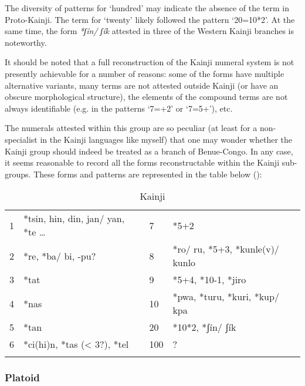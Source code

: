 The diversity of patterns for `hundred' may indicate the absence of the term in Proto-Kainji. The term for `twenty' likely followed the pattern ‘20=10*2’. At the same time, the form \textit{*ʃín/} \textit{ʃík} attested in three of the Western Kainji branches is noteworthy. 

It should be noted that a full reconstruction of the Kainji numeral system is not presently achievable for a number of reasons: some of the forms have multiple alternative variants, many terms are not attested outside Kainji (or have an obscure morphological structure), the elements of the compound terms are not always identifiable (e.g. in the patterns ‘7=+2’ or ‘7=5+’), etc.

The numerals attested within this group are so peculiar (at least for a non-specialist in the Kainji languages like myself) that one may wonder whether the Kainji group should indeed be treated as a branch of Benue-Congo. In any case, it seems reasonable to record all the forms reconstructable within the Kainji sub-groups. These forms and patterns are represented in the table below ():

\begin{table}
\caption{\label{tab:3:41}Kainji }


\begin{tabularx}{\textwidth}{llll}
\lsptoprule

1 & *tsin, hin, din, jan/ yan, *te … & 7 & *5+2\\
2 & *re, *ba/ bi, -pu? & 8 & *ro/ ru, *5+3, *kunle(v)/ kunlo\\
3 & *tat & 9 & *5+4, *10-1, *jiro\\
4 & *nas & 10 & *pwa, *turu, *kuri, *kup/ kpa\\
5 & *tan & 20 & *10*2, *ʃín/ ʃík\\
6 & *ci(hi)n, *tas (< 3?), *tel & 100 & ?\\
\lspbottomrule
\end{tabularx}
\end{table}

\clearpage
\subsubsection{Platoid}\label{sec:3.1.2.8}

